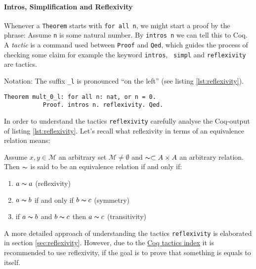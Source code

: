 	    \paragraph{Intros, Simplification and Reflexivity}
	     Whenever a \lstinline!Theorem! starts with \lstinline!for all n!, we might start a proof by the phrase:
	     Assume \lstinline!n! is some natural number. By \lstinline!intros n! we can tell this to Coq.\\
	     A {\itshape tactic} is a command used between \lstinline!Proof! and \lstinline!Qed!, 
	     which guides the process of checking some claim for example the keyword \lstinline!intros!, \lstinline! simpl! and \lstinline!reflexivity! 
	     are tactics.     
	      \begin{remark}{Notation:} 
	     The suffix \lstinline!_l! is pronounced ``on the left'' (see listing \ref{lst:reflexivity}). 
	 	 \begin{lstlisting}[caption = \lstinline!mult_0_l!, label= {lst:reflexivity}]
		 Theorem mult_0_l: for all n: nat, or n = 0.
		   Proof. intros n. reflexivity. Qed.
		 \end{lstlisting}
		 \end{remark} 
	      
	    In order to understand the tactics \lstinline!reflexivity! carefully analyse the Coq-output of listing \ref{lst:reflexivity}.   
	    Let's recall what reflexivity in terms of an equivalence relation means: 
	   \begin{definition}
	   Assume $x,y\in \mathcal{M}$ an arbitrary set $\mathcal{M}\neq\emptyset$ and $\thicksim\subset A \times A$ an arbitrary relation.
	   Then $\thicksim$ is said to be an equivalence relation if and only if:
	   \begin{enumerate}
	   \item $a\thicksim a$ (reflexivity)
	   \item $a \thicksim b$ if and only if $b \thicksim c$ (symmetry)
	   \item if $a \thicksim b$ and $ b\thicksim c$ then $a \thicksim c$ (transitivity) 
	   \end{enumerate}
	   \end{definition}
	     
	    A more detailed approach of understanding the tactics \lstinline!reflexivity! is elaborated in section \ref{sec:reflexivity}.  
	    However, due to the \href{https://pjreddie.com/coq-tactics/}{Coq tactics index} it is recommended to use reflexivity, if the goal is to prove that something is equals to itself.  
	      
